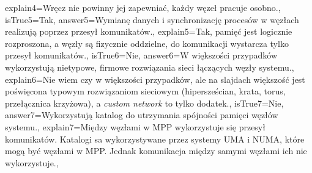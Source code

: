 \begin{enumerate}
\begin{minipage}{\textwidth}
{		explain4={Wręcz nie powinny jej zapewniać, każdy węzeł pracuje osobno.},%
		isTrue5={Tak},%
		answer5={Wymianę danych i synchronizację procesów w węzłach realizują poprzez przesył komunikatów.},%
		explain5={Tak, pamięć jest logicznie rozproszona, a węzły są fizycznie oddzielne, do komunikacji wystarcza tylko przesył komunikatów.},%
		isTrue6={Nie},%
		answer6={W większości przypadków wykorzystują nietypowe, firmowe rozwiązania sieci łączących węzły systemu.},%
		explain6={Nie wiem czy w większości przypadków, ale na slajdach większość jest poświęcona typowym rozwiązaniom sieciowym (hipersześcian, krata, torus, przełącznica krzyżowa), a \emph{custom network} to tylko dodatek.},%
		isTrue7={Nie},%
		answer7={Wykorzystują katalog do utrzymania spójności pamięci węzłów systemu.},%
		explain7={Między węzłami w MPP wykorzystuje się przesył komunikatów. Katalogi sa wykorzystywane przez systemy UMA i NUMA, które mogą być węzłami w MPP. Jednak komunikacja między samymi węzłami ich nie wykorzystuje.},%
	}
\end{minipage}
\begin{minipage}{\textwidth}
\end{minipage}
\begin{minipage}{\textwidth}
\end{minipage}
\begin{minipage}{\textwidth}
	\question{%
}
\end{minipage}
\end{enumerate}
